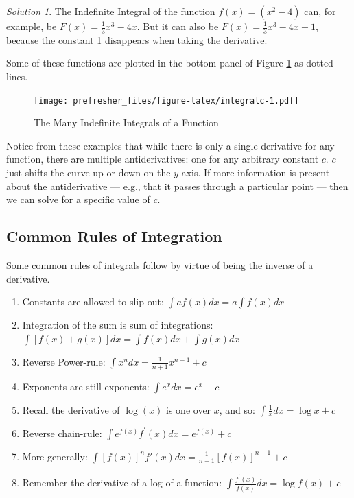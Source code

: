 \documentclass[
]{book}
\providecommand{\tightlist}{%
  \setlength{\itemsep}{0pt}\setlength{\parskip}{0pt}}
\theoremstyle{definition}
\theoremstyle{definition}
\theoremstyle{definition}
\theoremstyle{remark}
\newtheorem*{solution}{Solution}
\begin{document}
\begin{solution}
{}The Indefinite Integral of the function \(f(x) = (x^2-4)\) can, for example, be \(F(x) = \frac{1}{3}x^3 - 4x.\) But it can also be \(F(x) = \frac{1}{3}x^3 - 4x + 1\), because the constant 1 disappears when taking the derivative.
\end{solution}

Some of these functions are plotted in the bottom panel of Figure \ref{fig:integralc} as dotted lines.

\begin{figure}
\centering
\texttt{[image: prefresher\_files/figure-latex/integralc-1.pdf]}
\caption{\label{fig:integralc}The Many Indefinite Integrals of a Function}
\end{figure}

Notice from these examples that while there is only a single derivative for any function, there are multiple antiderivatives: one for any arbitrary constant \(c\). \(c\) just shifts the curve up or down on the \(y\)-axis. If more information is present about the antiderivative --- e.g., that it passes through a particular point --- then we can solve for a specific value of \(c\).

\hypertarget{common-rules-of-integration}{%
\subsection*{Common Rules of Integration}\label{common-rules-of-integration}}

Some common rules of integrals follow by virtue of being the inverse of a derivative.

\begin{enumerate}
\def\labelenumi{\arabic{enumi}.}
\tightlist
\item
  Constants are allowed to slip out: \(\int a f(x)dx = a\int f(x)dx\)
\item
  Integration of the sum is sum of integrations: \(\int [f(x)+g(x)]dx=\int f(x)dx + \int g(x)dx\)
\item
  Reverse Power-rule: \(\int x^n dx = \frac{1}{n+1} x^{n+1} + c\)
\item
  Exponents are still exponents: \(\int e^x dx = e^x +c\)
\item
  Recall the derivative of \(\log(x)\) is one over \(x\), and so: \(\int \frac{1}{x} dx = \log x + c\)
\item
  Reverse chain-rule: \(\int e^{f(x)}f^\prime(x)dx = e^{f(x)}+c\)
\item
  More generally: \(\int [f(x)]^n f'(x)dx = \frac{1}{n+1}[f(x)]^{n+1}+c\)
\item
  Remember the derivative of a log of a function: \(\int \frac{f^\prime(x)}{f(x)}dx=\log f(x) + c\)
\end{enumerate}
\end{document}
